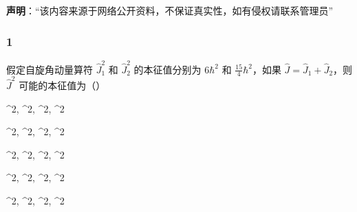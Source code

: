 
\textbf{声明}：“该内容来源于网络公开资料，不保证真实性，如有侵权请联系管理员”

\subsubsection{1}
假定自旋角动量算符 $\hat{J}_1^2$ 和 $\hat{J}_2^2$ 的本征值分别为 $6\hbar^2$ 和 $\frac{15}{4}\hbar^2$，如果 $\hat{J} = \hat{J}_1 + \hat{J}_2$，则 $\hat{J}^2$ 可能的本征值为（）

 \quad {}\hbar^2, \quad {}\hbar^2, \quad {}\hbar^2, \quad {}\hbar^2 



 \quad {}\hbar^2, \quad {}\hbar^2, \quad {}\hbar^2, \quad {}\hbar^2



 \quad {}\hbar^2, \quad {}\hbar^2, \quad {}\hbar^2, \quad {}\hbar^2



 \quad {}\hbar^2, \quad {}\hbar^2, \quad {}\hbar^2, \quad {}\hbar^2



 \quad {}\hbar^2, \quad {}\hbar^2, \quad {}\hbar^2, \quad {}\hbar^2
